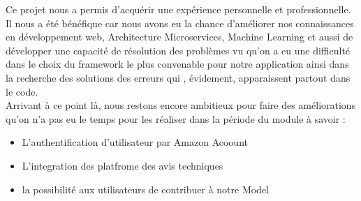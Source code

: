 Ce projet nous a permis d'acquérir une expérience personnelle et professionnelle. Il nous a été bénéfique  car nous avons eu la chance d'améliorer nos connaissances en développement web, Architecture Microservices, Machine Learning et aussi de développer une capacité de résolution des problèmes vu qu'on a eu une difficulté dans le choix du framework le plus convenable pour notre application ainsi dans la recherche des solutions des erreurs qui , évidement, apparaissent partout dans le code.\\

Arrivant à ce point là, nous restons encore ambitieux pour faire des améliorations qu’on n’a pas eu le temps pour les réaliser dans la période du module à savoir : \\

\begin{itemize}
    \item L'authentification d'utilisateur par Amazon Acoount
    \item L'integration des platfrome des avis techniques 
    \item la possibilité aux utilisateurs de contribuer à notre Model
\end{itemize}
